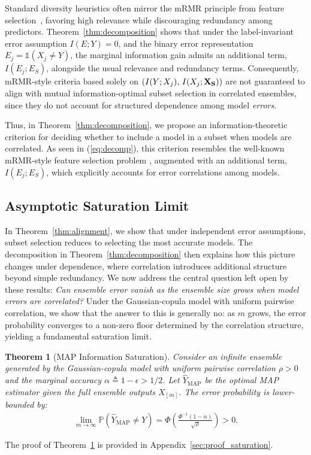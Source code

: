 \documentclass{article}
\theoremstyle{plain}
\newtheorem{theorem}{Theorem}[section]
\theoremstyle{definition}
\theoremstyle{remark}
\begin{document}
Standard diversity heuristics often mirror the mRMR principle from feature selection~\citep{peng2005}, favoring high relevance while discouraging redundancy among predictors. 
Theorem~\ref{thm:decomposition} shows that under the label-invariant error assumption $I(E;Y)=0$, and the binary error representation $E_j=\mathds{1}(X_j\neq Y)$, the marginal information gain admits an additional term, $I(E_j;E_S)$, alongside the usual relevance and redundancy terms. 
Consequently, mRMR-style criteria based solely on $(I(Y;X_j),\, I(X_j; {\bf X_S}))$ are not guaranteed to align with mutual information-optimal subset selection in correlated ensembles, since they do not account for structured dependence among model \emph{errors}.

Thus, in Theorem~\ref{thm:decomposition}, we propose an information-theoretic criterion for deciding whether to include a model in a subset when models are correlated. As seen in (\ref{eq:decomp}), this criterion resembles the well-known mRMR-style feature selection problem \citep{peng2005}, augmented with an additional term, $I(E_j; E_S)$, which explicitly accounts for error correlations among models.

\subsection{Asymptotic Saturation Limit}
\label{subsec:saturation}
In Theorem~\ref{thm:alignment}, we show that under independent error assumptions, subset selection reduces to selecting the most accurate models.
The decomposition in Theorem~\ref{thm:decomposition} then explains how this picture changes under dependence, where correlation introduces additional structure beyond simple redundancy.
We now address the central question left open by these results: \emph{Can ensemble error vanish as the ensemble size grows when model errors are correlated?} Under the Gaussian-copula model with uniform pairwise correlation, we show that the answer to this is generally no: as $m$ grows, the error probability converges to a non-zero floor determined by the correlation structure, yielding a fundamental saturation limit.


\begin{theorem}[MAP Information Saturation]
\label{thm:saturation}
Consider an infinite ensemble generated by the Gaussian-copula model with uniform pairwise correlation $\rho > 0$ and the marginal accuracy $\alpha \triangleq 1-\epsilon > 1/2$. Let $\hat{Y}_{\text{MAP}}$ be the optimal MAP estimator given the full ensemble outputs $X_{[m]}$. The error probability is lower-bounded by:
\begin{align}
    \lim_{m \to \infty} \mathbb{P}(\hat{Y}_{\text{MAP}} \neq Y) = \Phi\left( \frac{\Phi^{-1}(1-\alpha)}{\sqrt{\rho}} \right) > 0.
\end{align}
\end{theorem}
The proof of Theorem~\ref{thm:saturation} is provided in Appendix~\ref{sec:proof_saturation}.
\end{document}
